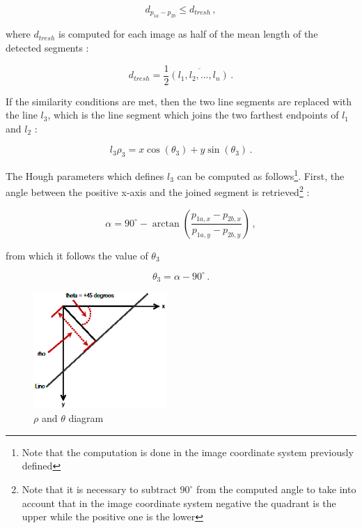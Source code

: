 \begin{equation}
  d_{p_{1a}-p_{2b}} \leqslant d_{tresh} \,,
\end{equation}

where $d_{tresh}$ is computed for each image as half of the mean length of the detected segments :

\begin{equation}
  d_{tresh} = {\frac{1}{2}} \overline{(l_1, l_2,\ldots, l_n)} \,.
\end{equation}

If the similarity conditions are met, then the two line segments are replaced with the line $l_3$, which is the line segment which joins the two farthest endpoints of $l_1$ and $l_2$ :

\begin{equation}
  l_3 \rho_3 = x \cos (\theta_3) +  y \sin (\theta_3) \,.
\end{equation}

The Hough parameters which defines $l_3$ can be computed as follows\footnote{Note that the computation is done in the image coordinate system previously defined}. First, the angle between the positive x-axis and the joined segment is retrieved\footnote{Note that it is necessary to subtract $90^{\circ}$ from the computed angle to take into account that in the image coordinate system negative the quadrant is the upper while the positive one is the lower} :

\begin{equation}
  \alpha = 90^{\circ} - \arctan{\left(\frac{p_{1a,x}-p_{2b,x}}{p_{1a,y}-p_{2b,y}}\right)} \,,
\end{equation}

from which it follows the value of $\theta_3$

\begin{equation}
  \theta_3 = \alpha - 90^{\circ} \,.
\end{equation}

\begin{figure}[htbp]
  \centering
  \includegraphics[width=0.45\textwidth]{gfx/hough_rho_theta_diagram.eps}
  \caption{$\rho$ and $\theta$ diagram}
  \label{fig:theposeproblem}
\end{figure}

